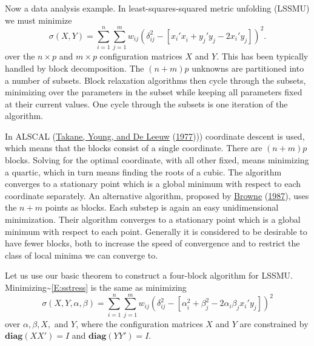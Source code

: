 \documentclass[
  12pt,
]{book}
\begin{document}
Now a data analysis example.
In least-squares-squared metric unfolding (LSSMU) we must minimize
\[
\sigma(X,Y)=
\sum_{i=1}^{n}\sum_{j=1}^{m}w_{ij}(\delta_{ij}^{2}-[x_{i}'x_{i}^{}+y_{j}'y_{j}^{}-2x_{i}'y_{j}^{}])^{2}.
\]
over the \(n\times p\) and \(m\times p\) configuration matrices \(X\) and \(Y\).
This has been typically handled by block decomposition. The \((n+m)p\) unknowns are partitioned
into a number of subsets. Block relaxation algorithms then cycle through the subsets, minimizing
over the parameters in the subset while keeping all parameters fixed at their current values. One
cycle through the subsets is one iteration of the algorithm.

In ALSCAL (\protect\hyperlink{ref-takane_young_deleeuw_A_77}{Takane, Young, and De Leeuw} (\protect\hyperlink{ref-takane_young_deleeuw_A_77}{1977}))) coordinate descent is used, which means that the blocks consist of a single
coordinate. There are \((n+m)p\) blocks. Solving for the optimal coordinate, with all other
fixed, means minimizing a quartic, which in turn means finding the roots of a cubic. The
algorithm converges to a stationary point which is a global minimum with respect to each
coordinate separately. An alternative algorithm, proposed by \protect\hyperlink{ref-browne_87}{Browne} (\protect\hyperlink{ref-browne_87}{1987}), uses the \(n+m\) points as blocks. Each substep is again an easy unidimensional minimization.
Their algorithm converges to a stationary point which is a global minimum
with respect to each point. Generally it is considered to be desirable to have fewer blocks,
both to increase the speed of convergence and to restrict the class of local minima we
can converge to.

Let us use our basic theorem to construct a four-block algorithm for LSSMU. Minimizing\textasciitilde{}\eqref{E:sstress} is the same as minimizing
\[
\sigma(X,Y,\alpha,\beta)=
\sum_{i=1}^{n}\sum_{j=1}^{m}w_{ij}(\delta_{ij}^{2}-[\alpha_{i}^{2}+\beta_{j}^{2}-2\alpha_{i}\beta_{j}x_{i}'y_{j}^{}])^{2}
\]
over \(\alpha,\beta, X,\) and \(Y\), where the configuration matrices \(X\) and \(Y\) are constrained by \(\mathbf{diag}(XX')=I\) and \(\mathbf{diag}(YY')=I\).
\end{document}
